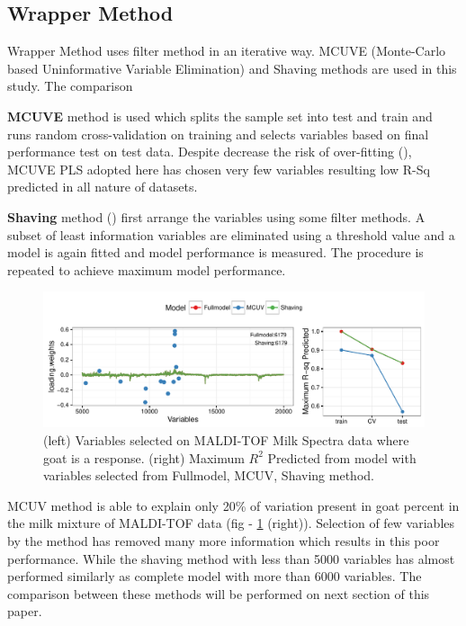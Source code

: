 \documentclass[10pt, a4paper]{article}\usepackage[]{graphicx}\usepackage[]{color}
\makeatletter
\def\maxwidth{ %
  \ifdim\Gin@nat@width>\linewidth
    \linewidth
  \else
    \Gin@nat@width
  \fi
}
\newenvironment{knitrout}{}{} %
\makeatother
\begin{document}
\subsection{Wrapper Method}
Wrapper Method uses filter method in an iterative way. MCUVE (Monte-Carlo based Uninformative Variable Elimination) and Shaving methods are used in this study. The comparison 

\textbf{MCUVE} method is used which splits the sample set into test and train and runs random cross-validation on training and selects variables based on final performance test on test data. Despite decrease the risk of over-fitting (\cite{mehmood2012review}), MCUVE PLS adopted here has chosen very few variables resulting low R-Sq predicted in all nature of datasets.

\textbf{Shaving} method (\cite{shavingCRAN}) first arrange the variables using some filter methods. A subset of least information variables are eliminated using a threshold value and a model is again fitted and model performance is measured. The procedure is repeated to achieve maximum model performance.

\begin{knitrout}\small
{}\color{fgcolor}\begin{figure}[H]
\includegraphics[width=\maxwidth]{figure/ShavingMCUV-1} \caption[(left) Variables selected on MALDI-TOF Milk Spectra data where goat is a response]{(left) Variables selected on MALDI-TOF Milk Spectra data where goat is a response. (right) Maximum $R^2$ Predicted from model with variables selected from Fullmodel, MCUV, Shaving method.}\label{fig:ShavingMCUV}
\end{figure}


\end{knitrout}

MCUV method is able to explain only 20\% of variation present in goat percent in the milk mixture of MALDI-TOF data (fig - \ref{fig:ShavingMCUV} (right)). Selection of few variables by the method has removed many more information which results in this poor performance. While the shaving method with less than 5000 variables has almost performed similarly as complete model with more than 6000 variables. The comparison between these methods will be performed on next section of this paper.
\end{document}

